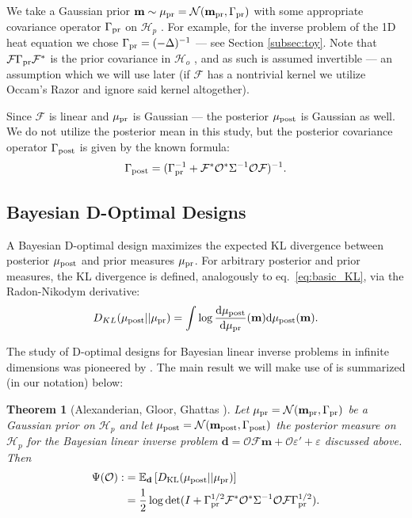 \documentclass[ba]{imsart}
\newcommand{\eps}{\varepsilon}
\newcommand{\der}{\text{\textup{d}}}
\newcommand{\hilp}{\mathcal{H}_p}
\newcommand{\hilo}{\mathcal{H}_o}
\newcommand{\obs}{\mathcal{O}}
\newcommand{\fwd}{\mathcal{F}}
\newcommand{\tar}{\Psi}
\newcommand{\data}{\mathbf{d}}
\newcommand{\param}{\mathbf{m}}
\newcommand{\normal}{\mathcal{N}}
\newcommand{\pr}{\mu_{\textup{pr}}} \newcommand{\post}{\mu_{\textup{post}}} \newcommand{\prmean}{\param_{\textup{pr}}} \newcommand{\postmean}{\param_{\textup{post}}} \newcommand{\postcov}{\Gamma_{\textup{post}}} \newcommand{\prcov}{\Gamma_{\textup{pr}}} \newcommand{\modcov}{\Gamma_{\textup{model}}} \newcommand{\tmp}{\mathcal{G}}
\theoremstyle{plain}
\newtheorem{theorem}{Theorem}
\theoremstyle{definition}
\theoremstyle{remark}
\begin{document}
We take a Gaussian prior \(\param \sim \pr = \normal(\prmean
,\prcov)\) with some appropriate covariance operator \(\prcov\) on
\(\hilp\) \cite{Stuart10}. For example, for the inverse problem of the
1D heat equation we chose $\prcov = (-\Delta)^{-1}$ --- see Section
\ref{subsec:toy}. Note that \(\fwd \prcov \fwd^*\) is the prior
covariance in \(\hilo\) \cite{Stuart10}, and as such is assumed
invertible --- an assumption which we will use later (if \(\fwd\) has
a nontrivial kernel we utilize Occam's Razor and ignore said kernel
altogether).

Since $\fwd$ is linear and $\pr$ is Gaussian --- the posterior
\(\post\) is Gaussian as well. We do not utilize the posterior mean in
this study, but the posterior covariance operator $\postcov$ is given
by the known formula\cite{Stuart10}:
\begin{align}\label{eq:postcov}
  \postcov = (\prcov^{-1} + \fwd^* \obs^* \Sigma^{-1} \obs \fwd
  )^{-1}.
\end{align}

\subsection{Bayesian D-Optimal Designs}\label{subsec:D_optimal_design} 
A Bayesian D-optimal design maximizes the expected KL divergence
between posterior \(\post\) and prior measures \(\pr\). For arbitrary
posterior and prior measures, the KL divergence is defined,
analogously to eq.~\ref{eq:basic_KL}, via the Radon-Nikodym
derivative:
\begin{equation*}
  D_{KL}(\post||\pr) = \int \log \frac{\der \post}{\der \pr}(\param) \der \post(\param).
\end{equation*}

The study of D-optimal designs for Bayesian linear inverse problems in
infinite dimensions was pioneered by \cite{AlexanderianGloorGhattas14,
  alexanderian2018efficient}. The main result we will make use of is
summarized (in our notation) below:

\begin{theorem}[Alexanderian, Gloor, Ghattas \cite{AlexanderianGloorGhattas14}]\label{thm:d_optimality}
  Let \(\pr = \normal(\prmean,\prcov)\) be a Gaussian prior on \(\hilp\)
  and let \(\post = \normal(\postmean,\postcov)\) the posterior measure
  on \(\hilp\) for the Bayesian linear inverse problem \(\data = \obs
  \fwd\param + \obs \eps' + \eps\) discussed above. Then
  \begin{align}\label{eq:objective}
    \begin{split}
      \tar( \obs) :&= \mathbb{E}_{\data}\left [ D_{\text{KL}} (\post || \pr ) \right ] \\
&= \frac12 \log \det 
      ( I + \prcov^{1/2}  \fwd ^* \obs^* \Sigma^{-1} \obs \fwd \prcov^{1/2}).
    \end{split}
  \end{align}
\end{theorem}
\end{document}

